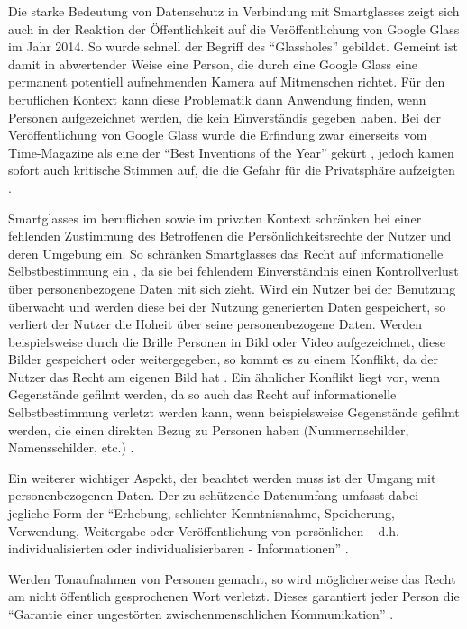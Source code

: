 Die starke Bedeutung von Datenschutz in Verbindung mit Smartglasses zeigt sich auch in der Reaktion der Öffentlichkeit auf die Veröffentlichung von Google Glass im Jahr 2014. So wurde schnell der Begriff des \enquote{Glassholes} \cite[S.~14]{ThomasDirkMetzgerHelmutNiegemannHrsg2018} gebildet. Gemeint ist damit in abwertender Weise eine Person, die durch eine Google Glass eine permanent potentiell aufnehmenden Kamera auf Mitmenschen richtet. Für den beruflichen Kontext kann diese Problematik dann Anwendung finden, wenn Personen aufgezeichnet werden, die kein Einverständis gegeben haben. Bei der Veröffentlichung von Google Glass wurde die Erfindung zwar einerseits vom Time-Magazine als eine der \enquote{Best Inventions of the Year} gekürt \cite{Bilton2015}, jedoch kamen sofort auch kritische Stimmen auf, die die Gefahr für die Privatsphäre aufzeigten \cite[S.~67]{Schwenke2016}. 

Smartglasses im beruflichen  sowie im privaten Kontext schränken bei einer fehlenden Zustimmung des Betroffenen die Persönlichkeitsrechte der Nutzer und deren Umgebung ein. So schränken Smartglasses das Recht auf informationelle Selbstbestimmung ein \cite[S.~100]{Schwenke2016}, da sie bei fehlendem Einverständnis einen Kontrollverlust über personenbezogene Daten mit sich zieht. Wird ein Nutzer bei der Benutzung überwacht und werden diese bei der Nutzung generierten Daten gespeichert, so verliert der Nutzer die Hoheit über seine personenbezogene Daten. Werden beispielsweise durch die Brille Personen in Bild oder Video aufgezeichnet, diese Bilder gespeichert oder weitergegeben, so kommt es zu einem Konflikt, da der Nutzer das Recht am eigenen Bild hat \cite[S.~104ff]{Schwenke2016} \cite[S.~109f]{Schwenke2016}. 
Ein ähnlicher Konflikt liegt vor, wenn Gegenstände gefilmt werden, da so auch das Recht auf informationelle Selbstbestimmung verletzt werden kann, wenn beispielsweise Gegenstände gefilmt werden, die einen direkten Bezug zu Personen haben (Nummernschilder, Namensschilder, etc.) \cite[S.~106]{Schwenke2016}. 

Ein weiterer wichtiger Aspekt, der beachtet werden muss ist der Umgang mit personenbezogenen Daten. Der zu schützende Datenumfang umfasst dabei jegliche Form der
\enquote{Erhebung, schlichter Kenntnisnahme, Speicherung, Verwendung, Weitergabe oder Veröffentlichung von persönlichen – d.h. individualisierten oder individualisierbaren - Informationen} \cite[S.~108]{Schwenke2016}.

Werden Tonaufnahmen von Personen gemacht, so wird möglicherweise das Recht am nicht öffentlich gesprochenen Wort verletzt. Dieses garantiert jeder Person die \enquote{Garantie einer ungestörten zwischenmenschlichen Kommunikation} \cite[S.~112]{Schwenke2016}.

